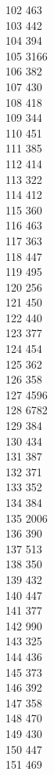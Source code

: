 { 102	463 \\
 103	442 \\
 104	394 \\
 105	3166 \\
 106	382 \\
 107	430 \\
 108	418 \\
 109	344 \\
 110	451 \\
 111	385 \\
 112	414 \\
 113	322 \\
 114	412 \\
 115	360 \\
 116	463 \\
 117	363 \\
 118	447 \\
 119	495 \\
 120	256 \\
 121	450 \\
 122	440 \\
 123	377 \\
 124	454 \\
 125	362 \\
 126	358 \\
 127	4596 \\
 128	6782 \\
 129	384 \\
 130	434 \\
 131	387 \\
 132	371 \\
 133	352 \\
 134	384 \\
 135	2006 \\
 136	390 \\
 137	513 \\
 138	350 \\
 139	432 \\
 140	447 \\
 141	377 \\
 142	990 \\
 143	325 \\
 144	436 \\
 145	373 \\
 146	392 \\
 147	358 \\
 148	470 \\
 149	430 \\
 150	447 \\
 151	469 \\
}
